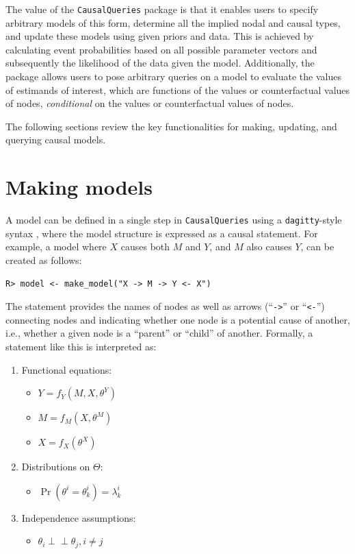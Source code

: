 \documentclass[
  11pt,
  article]{jss}
\providecommand{\tightlist}{%
  \setlength{\itemsep}{0pt}\setlength{\parskip}{0pt}}\usepackage{longtable,booktabs,array}
\begin{document}
The value of the \texttt{CausalQueries} package is that it enables users
to specify arbitrary models of this form, determine all the implied
nodal and causal types, and update these models using given priors and
data. This is achieved by calculating event probabilities based on all
possible parameter vectors and subsequently the likelihood of the data
given the model. Additionally, the package allows users to pose
arbitrary queries on a model to evaluate the values of estimands of
interest, which are functions of the values or counterfactual values of
nodes, \emph{conditional} on the values or counterfactual values of
nodes.

The following sections review the key functionalities for making,
updating, and querying causal models.

\section{Making models}\label{sec-make}

A model can be defined in a single step in \texttt{CausalQueries} using
a \texttt{dagitty}-style syntax \citep{textor_robust_2016}, where the
model structure is expressed as a causal statement. For example, a model
where \(X\) causes both \(M\) and \(Y\), and \(M\) also causes \(Y\),
can be created as follows:

\begin{verbatim}
R> model <- make_model("X -> M -> Y <- X")
\end{verbatim}

The statement provides the names of nodes as well as arrows
(``\texttt{-\textgreater{}}'' or ``\texttt{\textless{}-}'') connecting
nodes and indicating whether one node is a potential cause of another,
i.e., whether a given node is a ``parent'' or ``child'' of another.
Formally, a statement like this is interpreted as:

\begin{enumerate}
\def\labelenumi{\arabic{enumi}.}
\item
  Functional equations:

  \begin{itemize}
  \tightlist
  \item
    \(Y = f_Y(M, X, \theta^Y)\)
  \item
    \(M = f_M(X, \theta^M)\)
  \item
    \(X = f_X(\theta^X)\)
  \end{itemize}
\item
  Distributions on \(\Theta\):

  \begin{itemize}
  \tightlist
  \item
    \(\Pr(\theta^i = \theta^i_k) = \lambda^i_k\)
  \end{itemize}
\item
  Independence assumptions:

  \begin{itemize}
  \tightlist
  \item
    \(\theta_i \perp\!\!\! \perp \theta_j, i\neq j\)
  \end{itemize}
\end{enumerate}
\end{document}
